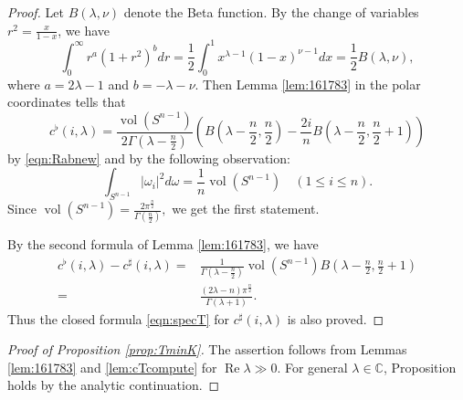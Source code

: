 \begin{proof}
Let $B(\lambda,\nu)$ denote the Beta function.  
By the change of variables
 $r^2= \frac{x}{1-x}$, 
 we have
\begin{equation}
\label{eqn:Rabnew}
  \int_0^{\infty}
  r^a (1+r^2)^b d r 
  = 
  \frac 1 2
  \int_0^1 x^{\lambda-1} (1-x)^{\nu-1} d x
  = \frac 1 2 B(\lambda,\nu), 
\end{equation}
where $a = 2 \lambda-1$ and $b=-\lambda-\nu$.  
Then Lemma \ref{lem:161783}
 in the polar coordinates tells that 
\[
c^{\flat}(i,\lambda)
=
\frac{\operatorname{vol}(S^{n-1})}{2\Gamma(\lambda-\frac n2)}
(B(\lambda-\frac n2,\frac n 2) 
- \frac{2i}{n}B(\lambda- \frac n 2,\frac n 2+1))
\]
by \eqref{eqn:Rabnew} and by the following observation:
\[
   \int_{S^{n-1}} |\omega_i|^2 d \omega
   =
  \frac 1 n \operatorname{vol}(S^{n-1})
\quad
  (1 \le i \le n).  
\]
Since
$
\operatorname{vol}(S^{n-1})
=\frac{2 \pi^{\frac n 2}}{\Gamma(\frac n 2)}, 
$
we get the first statement.  



By the second formula of Lemma \ref{lem:161783}, 
 we have 
\begin{align*}
 c^{\flat}(i,\lambda)-c^{\sharp}(i,\lambda)
 =&\frac{1}{\Gamma(\lambda-\frac n 2)}
   {\operatorname{vol}}(S^{n-1}) B(\lambda-\frac n2, \frac n2 +1)
\\
=&\frac{(2\lambda-n) \pi^{\frac n 2}}
       {\Gamma(\lambda+1)}.  
\end{align*}
Thus the closed formula \eqref{eqn:specT}
 for $c^{\sharp}(i,\lambda)$ is also proved.  
\end{proof}

\begin{proof}
[Proof of Proposition \ref{prop:TminK}]
The assertion follows from Lemmas \ref{lem:161783} and \ref{lem:cTcompute}
 for $\operatorname{Re}\lambda\gg 0$.  
For general $\lambda \in {\mathbb{C}}$, 
Proposition holds by the analytic continuation.  
\end{proof}



